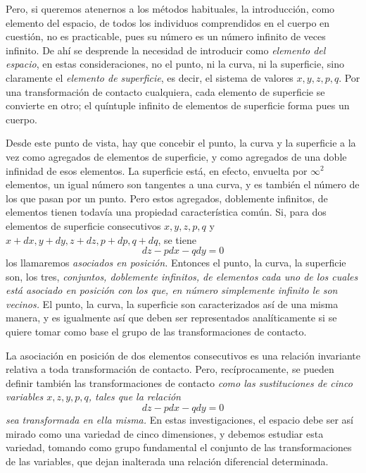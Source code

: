 \documentclass[a4paper, 12pt]{article}
\begin{document}
Pero, si queremos atenernos a los métodos habituales, la introducción, como elemento del espacio, de todos los individuos comprendidos en el cuerpo en cuestión, no es practicable, pues su número es un número infinito de veces infinito. De ahí se desprende la necesidad de introducir como \textit{elemento del espacio}, en estas consideraciones, no el punto, ni la curva, ni la superficie, sino claramente el \textit{elemento de superficie}, es decir, el sistema de valores $x, y, z, p, q$. Por una transformación de contacto cualquiera, cada elemento de superficie se convierte en otro; el quíntuple infinito de elementos de superficie forma pues un cuerpo.

Desde este punto de vista, hay que concebir el punto, la curva y la superficie a la vez como agregados de elementos de superficie, y como agregados de una doble infinidad de esos elementos. La superficie está, en efecto, envuelta por $\infty ^{2}$ elementos, un igual número son tangentes a una curva, y es también el número de los que pasan por un punto. Pero estos agregados, doblemente infinitos, de elementos tienen todavía una propiedad característica común. Si, para dos elementos de superficie consecutivos $x, y, z, p, q $ y $x + dx, y + dy, z + dz, p + dp, q + dq$, se tiene $$ dz - pdx - qdy = 0 $$ los llamaremos \textit{asociados en posición.} Entonces el punto, la curva, la superficie son, los tres, \textit{conjuntos, doblemente infinitos, de elementos cada uno de los cuales está asociado en posición con los que, en número simplemente infinito le son vecinos.} El punto, la curva, la superficie son caracterizados así de una misma manera, y es igualmente así que deben ser representados analíticamente si se quiere tomar como base el grupo de las transformaciones de contacto.

La asociación en posición de dos elementos consecutivos es una relación invariante relativa a toda transformación de contacto. Pero, recíprocamente, se pueden definir también las transformaciones de contacto \textit{como las sustituciones de cinco variables $x, z, y, p, q$, tales que la relación $$ dz - pdx - qdy = 0 $$ sea transformada en ella misma.} En estas investigaciones, el espacio debe ser así mirado como una variedad de cinco dimensiones, y debemos estudiar esta variedad, tomando como grupo fundamental el conjunto de las transformaciones de las variables, que dejan inalterada una relación diferencial determinada.
\end{document}
